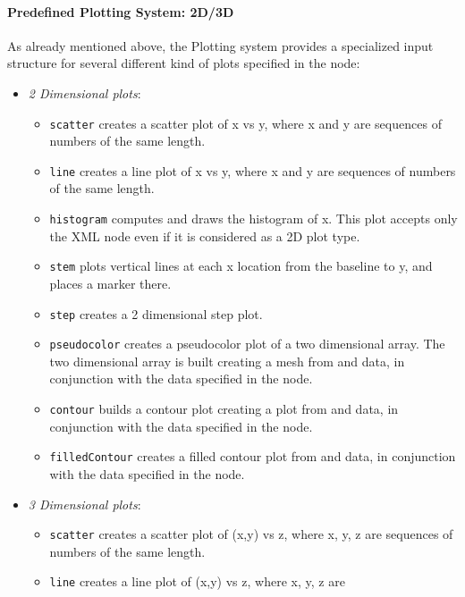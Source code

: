 \paragraph{Predefined Plotting System: 2D/3D \label{sec:23Dplotting}}
As already mentioned above, the Plotting system provides a specialized input
structure for several different kind of plots specified in the 
node:
 \begin{itemize}
  \item \textit{2 Dimensional plots}:
  \begin{itemize}
    \item \texttt{scatter} creates a scatter plot of x vs y, where x and y are
    sequences of numbers of the same length.
    \item \texttt{line} creates a line plot of x vs y, where x and y are
    sequences of numbers of the same length.
    \item \texttt{histogram} computes and draws the histogram of x.
    \nb This plot accepts only the XML node  even if it
    is considered as a 2D plot type.
    \item \texttt{stem} plots vertical lines at each x location from the
    baseline to y, and places a marker there.
    \item \texttt{step} creates a 2 dimensional step plot.
    \item \texttt{pseudocolor} creates a pseudocolor plot of a two dimensional
    array.
    The two dimensional array is built creating a mesh from  and
     data, in conjunction with the data specified in the
     node.
    \item \texttt{contour} builds a contour plot creating a plot from
     and  data, in conjunction with the data specified in
    the  node.
    \item \texttt{filledContour} creates a filled contour plot from 
    and  data, in conjunction with the data specified in the
     node.
  \end{itemize}
  \item \textit{3 Dimensional plots}:
  \begin{itemize}
    \item \texttt{scatter} creates a scatter plot of (x,y) vs z, where x, y, z
    are sequences of numbers of the same length.
    \item \texttt{line} creates a line plot of (x,y) vs z, where x, y, z are

\end{itemize}
\end{itemize}

